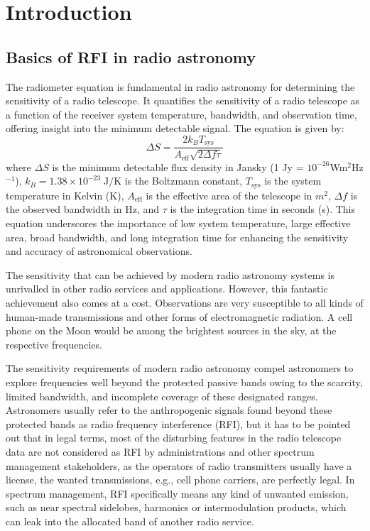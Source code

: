 \section{Introduction}
\label{section:hardware: introduction}


\subsection{Basics of RFI in radio astronomy}
The radiometer equation is fundamental in radio astronomy for determining the sensitivity of a radio telescope. It quantifies the sensitivity of a radio telescope as a function of the receiver system temperature, bandwidth, and observation time, offering insight into the minimum detectable signal. The equation is given by:
\[ \Delta S = \frac{2 k_B T_{\text{sys}}}{A_{\text{eff}} \sqrt{2 \Delta f \tau}} \]
where \( \Delta S \) is the minimum detectable flux density in Jansky (1 Jy = $10^{-26}$Wm$^2$Hz$^{-1}$), \( k_B =1.38 \times 10^{-23} \;\text{J} / \text{K}\) is the Boltzmann constant, \( T_{\text{sys}} \) is the system temperature in Kelvin (K), \( A_{\text{eff}} \) is the effective area of the telescope in $m^2$, \( \Delta f \) is the observed bandwidth in Hz, and \( \tau \) is the integration time in seconds (s). This equation underscores the importance of low system temperature, large effective area, broad bandwidth, and long integration time for enhancing the sensitivity and accuracy of astronomical observations.

The sensitivity that can be achieved by modern radio astronomy systems is unrivalled in other radio services and applications. However, this fantastic achievement also comes at a cost. Observations are very susceptible to all kinds of human-made transmissions and other forms of electromagnetic radiation. A cell phone on the Moon would be among the brightest sources in the sky, at the respective frequencies. 

The sensitivity requirements of modern radio astronomy compel astronomers to explore frequencies well beyond the protected passive bands owing to the scarcity, limited bandwidth, and incomplete coverage of these designated ranges. Astronomers usually refer to the anthropogenic signals found beyond these protected bands as radio frequency interference (RFI), but it has to be pointed out that in legal terms, most of the disturbing features in the radio telescope data are not considered as RFI by administrations and other spectrum management stakeholders, as the operators of radio transmitters usually have a license, the wanted transmissions, e.g., cell phone carriers, are perfectly legal. In spectrum management, RFI specifically means any kind of unwanted emission, such as near spectral sidelobes, harmonics or intermodulation products, which can leak into the allocated band of another radio service.

